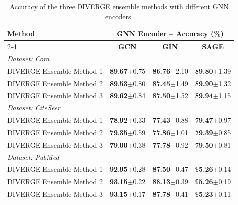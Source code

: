 \documentclass[a4paper,fleqn]{cas-sc}
\begin{document}
\begin{table}[htbp]
\centering
\caption{Accuracy of the three DIVERGE ensemble methods with different GNN encoders.}
\label{tab:diverge_gnn_encoders}

\small
\setlength{\tabcolsep}{3pt}
\begin{tabular*}{\textwidth}{@{\extracolsep{\fill}} lccc @{}}
\toprule
\multirow{2}{*}{\textbf{Method}} & \multicolumn{3}{c}{\textbf{GNN Encoder -- Accuracy (\%)}} \\
\cmidrule(lr){2-4}
 & \textbf{GCN} & \textbf{GIN} & \textbf{SAGE} \\
\midrule
\multicolumn{4}{l}{\textit{Dataset: Cora}} \\
\midrule
DIVERGE Ensemble Method 1 & \textbf{89.67}{\scriptsize$\pm$0.75} & \textbf{86.76}{\scriptsize$\pm$2.10} & \textbf{89.80}{\scriptsize$\pm$1.39} \\
DIVERGE Ensemble Method 2 & \textbf{89.53}{\scriptsize$\pm$0.80} & \textbf{87.45}{\scriptsize$\pm$1.49} & \textbf{89.90}{\scriptsize$\pm$1.32} \\
DIVERGE Ensemble Method 3 & \textbf{89.62}{\scriptsize$\pm$0.84} & \textbf{87.50}{\scriptsize$\pm$1.52} & \textbf{89.94}{\scriptsize$\pm$1.15} \\
\midrule
\multicolumn{4}{l}{\textit{Dataset: CiteSeer}} \\
\midrule
DIVERGE Ensemble Method 1 & \textbf{78.92}{\scriptsize$\pm$0.33} & \textbf{77.43}{\scriptsize$\pm$0.88} & \textbf{79.47}{\scriptsize$\pm$0.97} \\
DIVERGE Ensemble Method 2 & \textbf{79.35}{\scriptsize$\pm$0.59} & \textbf{77.86}{\scriptsize$\pm$1.01} & \textbf{79.39}{\scriptsize$\pm$0.85} \\
DIVERGE Ensemble Method 3 & \textbf{79.00}{\scriptsize$\pm$0.38} & \textbf{77.78}{\scriptsize$\pm$0.92} & \textbf{79.50}{\scriptsize$\pm$0.81} \\
\midrule
\multicolumn{4}{l}{\textit{Dataset: PubMed}} \\
\midrule
DIVERGE Ensemble Method 1 & \textbf{92.95}{\scriptsize$\pm$0.28} & \textbf{87.50}{\scriptsize$\pm$0.47} & \textbf{95.26}{\scriptsize$\pm$0.14} \\
DIVERGE Ensemble Method 2 & \textbf{93.15}{\scriptsize$\pm$0.22} & \textbf{88.13}{\scriptsize$\pm$0.39} & \textbf{95.26}{\scriptsize$\pm$0.19} \\
DIVERGE Ensemble Method 3 & \textbf{93.15}{\scriptsize$\pm$0.17} & \textbf{87.78}{\scriptsize$\pm$0.41} & \textbf{95.23}{\scriptsize$\pm$0.11} \\

\end{tabular*}
\end{table}
\end{document}
